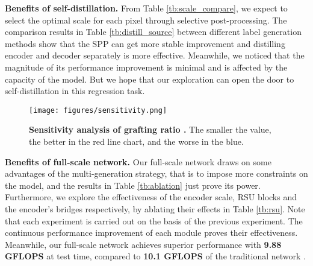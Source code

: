 \documentclass[10pt,twocolumn,letterpaper]{article}
\begin{document}
\noindent
{\bf Benefits of self-distillation.} From Table \ref{tb:scale_compare}, we expect to 
select the optimal scale for each pixel through selective post-processing. The comparison 
results in Table \ref{tb:distill_source} between different label generation methods show 
that the SPP can get more stable improvement and distilling encoder and decoder separately 
is more effective. Meanwhile, we noticed that the magnitude of its performance 
improvement is minimal and is affected by the capacity of the model. But we hope 
that our exploration can open the door to self-distillation in this regression task.

\begin{figure}[t]
   \begin{center}
      \texttt{[image: figures/sensitivity.png]}
   \end{center}
      \caption{{\bf Sensitivity analysis of grafting ratio .} The smaller the value, the 
      better in the red line chart, and the worse in the blue.}
   \label{fig:sensitivity}
\end{figure}

\noindent
{\bf Benefits of full-scale network.} Our full-scale network draws on some advantages of 
the multi-generation strategy, that is to impose more constraints on the model, 
and the results in Table \ref{tb:ablation} 
just prove its power. Furthermore, we explore the effectiveness of the encoder scale, 
RSU blocks and the encoder's bridges respectively, by ablating their effects in 
Table \ref{tb:rsu}. Note that each experiment 
is carried out on the basis of the previous experiment. The continuous performance 
improvement of each module proves their effectiveness. Meanwhile, our full-scale network 
achieves superior performance with {\bf9.88 GFLOPS} at test time, compared to 
{\bf10.1 GFLOPS} of the traditional network \cite{Godard2019,Watson2019,Zhu2020}.


\begin{table}
   \begin{center}
   \end{center}
   \caption{{\bf Ablation study on full-scale network}. Conducted by continuously 
   accumulating each module with input size .}
   \label{tb:rsu}
   \vspace{-0.2cm}
\end{table}
\end{document}
